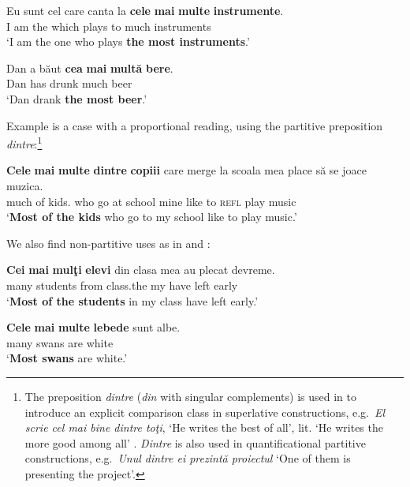 \documentclass[output=paper
,modfonts
,nonflat]{langsci/langscibook}
\begin{document}
\ea \label{ex:coppockstrand:41}
\gll Eu sunt cel care canta la \textbf{cele} \textbf{mai} \textbf{multe} \textbf{instrumente}.\\
I am the which plays to  \cmpr{} {much} instruments\\
\glt `I am the one who plays \textbf{the most instruments}.'
\z

\ea \label{ex:coppockstrand:42}
\gll Dan a băut \textbf{cea} \textbf{mai} \textbf{multă} \textbf{bere}.\\
Dan has drunk  \cmpr{} much beer\\
\glt `Dan drank \textbf{the most beer}.'
\z

Example  is a case with a proportional reading, using the partitive preposition \textit{dintre}:\footnote{The preposition \textit{dintre} (\textit{din} with singular complements) is used in  to introduce an explicit comparison class in superlative constructions, e.g.\ \textit{El scrie cel mai bine dintre toţi}, `He writes the best of all', lit. `He writes the more good among all' \citep[169]{Cojocaru2003}.  \textit{Dintre} is also used in quantificational partitive constructions, e.g.\ \textit{Unul dintre ei prezintă proiectul} `One of them is presenting the project'.}

\ea \label{ex:coppockstrand:43}
\gll \textbf{Cele} \textbf{mai} \textbf{multe} \textbf{dintre} \textbf{copiii} care merge la scoala mea place să se joace muzica.\\
 \cmpr{} {much} of kids. who go at school mine like to \textsc{refl} play music \\
\glt `\textbf{Most of the kids} who go to my school like to play music.' 
\z

We also find non-partitive uses as in  and :

\ea \label{ex:coppockstrand:44}
\gll \textbf{Cei} \textbf{mai} \textbf{mulţi} \textbf{elevi} din clasa mea au plecat devreme.\\
 \cmpr{} many students from class.the my have left early\\
\glt `\textbf{Most of the students} in my class have left early.'
\z

\ea \label{ex:coppockstrand:45}
\gll \textbf{Cele} \textbf{mai} \textbf{multe} \textbf{lebede} sunt albe.\\
 \cmpr{} many swans are white\\
\glt `\textbf{Most swans} are white.'
\z
\end{document}
